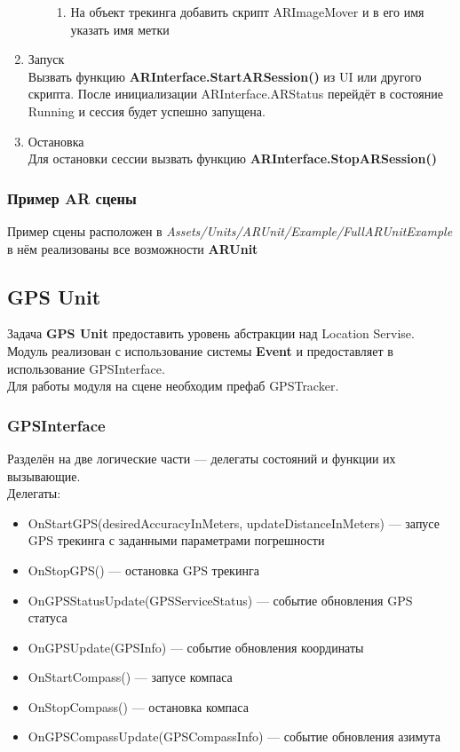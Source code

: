 \documentclass[a4paper, 11pt, titlepage]{article}
\begin{document}
\begin{enumerate}
\begin{enumerate}
\begin{enumerate}
                  \item На объект трекинга добавить скрипт ARImageMover и в его имя указать имя метки
                \end{enumerate}
              \end{enumerate}
            \item Запуск \\
              Вызвать функцию \textbf{ARInterface.StartARSession()} из UI или другого скрипта. После инициализации ARInterface.ARStatus 
              перейдёт в состояние Running и сессия будет успешно запущена.
            \item Остановка \\
              Для остановки сессии вызвать функцию \textbf{ARInterface.StopARSession()}
        \end{enumerate}
      
      \subsubsection{Пример AR сцены}
        Пример сцены расположен в \textit{Assets/Units/ARUnit/Example/FullARUnitExample} в нём реализованы все возможности \textbf{ARUnit}

    \subsection{GPS Unit}
      Задача \textbf{GPS Unit} предоставить уровень абстракции над Location Servise.\\
      Модуль реализован с использование системы \textbf{Event} и предоставляет в использование GPSInterface.\\
      Для работы модуля на сцене необходим префаб GPSTracker.
    \subsubsection{GPSInterface}
      Разделён на две логические части --- делегаты состояний и функции их вызывающие. \\
      Делегаты:
      \begin{itemize}
        \item OnStartGPS(desiredAccuracyInMeters, updateDistanceInMeters) --- запусе GPS трекинга
        с заданными параметрами погрешности
        \item OnStopGPS() --- остановка GPS трекинга
        \item OnGPSStatusUpdate(GPSServiceStatus) --- событие обновления GPS статуса 
        \item OnGPSUpdate(GPSInfo) --- событие обновления координаты 
        \item OnStartCompass() --- запусе компаса
        \item OnStopCompass() --- остановка компаса
        \item OnGPSCompassUpdate(GPSCompassInfo) --- событие обновления азимута
      \end{itemize}
\end{document}
